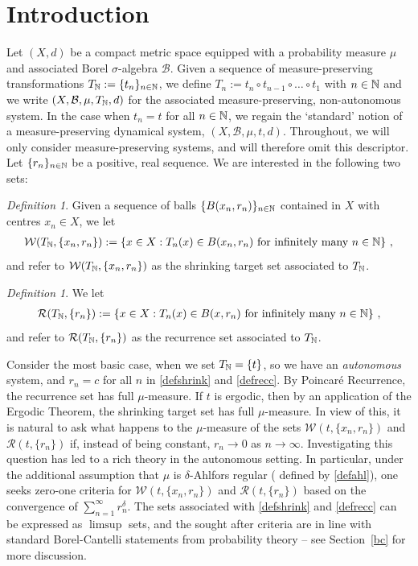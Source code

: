 \documentclass[11pt,reqno]{amsart}
\newcommand{\N}{{\Bbb N}}
\newcommand{\0}{\mathbf{0}}
\newtheorem{definition}{Definition}
\theoremstyle{remark}
\numberwithin{equation}{section}
\newtheorem{definition}[theorem]{Definition}
\theoremstyle{remark}
\numberwithin{equation}{section}
\newcommand{\cR}{\mathcal{R}}
\begin{document}
\section{Introduction}
Let $(X, d)$ be a compact metric space equipped with a probability measure $\mu$ and associated Borel $\sigma$-algebra $\mathcal{B}$. 
Given a sequence of measure-preserving transformations $T_\N:=\{t_n\}_{n \in \N}$, we define
$ T_n := t_n \circ t_{n-1} \circ \dots \circ t_1
$ with $n \in \N$ and we write $(X,\mathcal{B},\mu,T_\N,d)$ for the associated measure-preserving, non-autonomous system. In the case when $t_n=t$ for all $n \in \N$,  we regain  the `standard' notion of a measure-preserving dynamical system, $(X,\mathcal{B},\mu,t,d)$. Throughout, we will only consider measure-preserving systems, and will therefore omit this descriptor.
Let $\{r_n\}_{n \in \N}$ be a positive, real sequence. We are interested in the following two sets:
\begin{definition}
Given a sequence of balls $\{B(x_n,r_n)\}_{n \in \N}$ contained in $X$ with centres $x_n \in X$, %
we let
\begin{eqnarray}\label{defshrink}
  \mathcal{W}(T_\N,\{x_n, r_n\}) :=  \left\{  x \in X :  T_{n}(x) \in B(x_n,r_n) \hbox{ for infinitely many }n\in \mathbb{N} \right\} \, ,
\end{eqnarray}
and refer to $\mathcal{W}(T_\N,\{x_n, r_n\})$ as the shrinking target set associated to $T_\N$.
\end{definition} 
\begin{definition}
    We let
\begin{eqnarray}\label{defrecc}
  \cR( T_\N,\{r_n\} ) := \left\{  x \in X :  T_{n}(x) \in B(x,r_n) \hbox{ for infinitely many }n\in \mathbb{N} \right\} \, , 
\end{eqnarray}
and refer to $\cR( T_\N,\{r_n\} )$ as the recurrence set associated to $T_\N$.
\end{definition}


Consider the most basic case, when we set $T_\N=\{t\}$, so we have an \emph{autonomous} system, and $r_n=c$ for all $n$  in \eqref{defshrink} and \eqref{defrecc}. By Poincar\'{e} Recurrence, the recurrence set has full $\mu$-measure. If $t$ is ergodic, then by an application of the Ergodic Theorem, the shrinking target set has full $\mu$-measure. 
 In view of this, it is natural to ask what happens to the $\mu$-measure of the sets $\mathcal{W}(t,\{x_n, r_n\})$ and $\cR(t,\{r_n\})$ if, instead of being constant, $r_n \to 0$ as $n \to \infty$. Investigating this question has led to a rich theory in the autonomous setting.   In particular, under the additional assumption  that $\mu$ is $\delta$-Ahlfors regular ( defined by \eqref{defahl}), one seeks zero-one criteria for $\mathcal{W}(t,\{x_n, r_n\})$ and $\mathcal{R}(t,\{r_n\})$  based on the convergence of $\sum_{n=1}^\infty r_n^\delta$. The sets associated with \eqref{defshrink} and \eqref{defrecc} can be expressed as $\limsup$ sets, and the sought after criteria are in line with standard Borel-Cantelli statements from probability theory -- see Section~\ref{bc} for more discussion.
\end{document}
